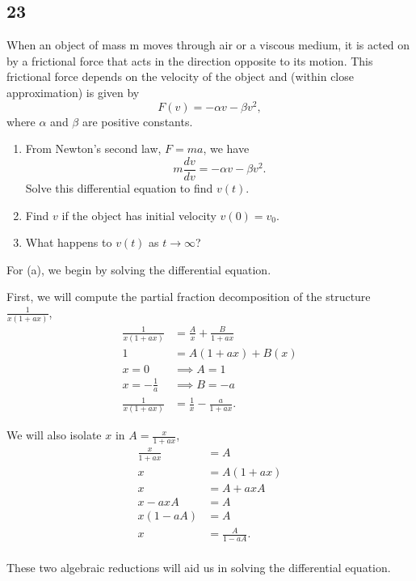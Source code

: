 \documentclass[../hw11]{subfiles}
\begin{document}
\subsection*{23}
When an object of mass m moves through air or a viscous medium, it is acted on by a frictional force that acts in the direction opposite to its motion. 
This frictional force depends on the velocity of the object and (within close approximation) is given by 
\[F(v) = -\alpha v - \beta v^2,\] 
where $\alpha$ and $\beta$ are positive constants. 

\begin{enumerate}[label= (\alph*)]
    \item From Newton's second law, $F = ma$, we have 
    \[m \frac{dv}{dv} = -\alpha v- \beta v^2.\]
    Solve this differential equation to find $v(t)$.
    \item Find $v$ if the object has initial velocity $v(0)=v_0$.
    \item What happens to $v(t)$ as $t\to\infty$?
\end{enumerate}

For (a), we begin by solving the %
differential equation.

First, we will compute the partial fraction decomposition of the structure $\frac{1}{x(1+ax)}$,
\begin{align*}
    \frac{1}{x(1+ax)}&=\frac{A}{x}+\frac{B}{1+ax} \\
    1&=A(1+ax)+B(x) \\
    x=0 &\implies A=1 \\
    x=-\frac{1}{a} &\implies B=-a \\
    \frac{1}{x(1+ax)}&=\frac{1}{x}-\frac{a}{1+ax}.
\end{align*} 

We will also isolate $x$ in $A=\frac{x}{1+ax}$,
\begin{align*}
    \frac{x}{1+ax}&=A \\
    x&=A(1+ax) \\
    x&=A+axA \\
    x-axA&=A \\
    x(1-aA)&=A \\
    x&=\frac{A}{1-aA}. \\
\end{align*}

These two algebraic reductions will aid us in solving the differential equation.
\end{document}
